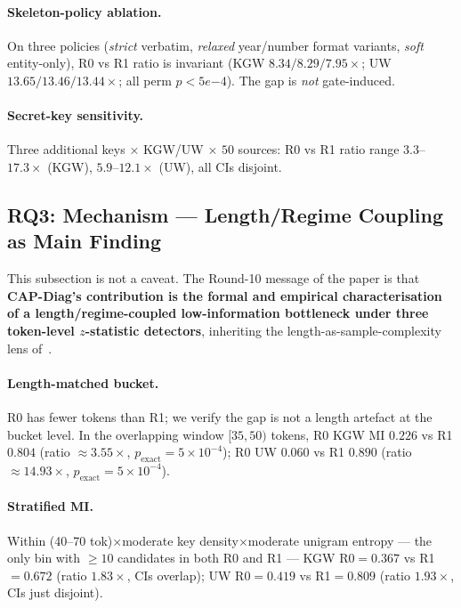 \documentclass[11pt]{article}
\begin{document}
\paragraph{Skeleton-policy ablation.} On three policies
(\emph{strict} verbatim, \emph{relaxed} year/number format variants,
\emph{soft} entity-only), R0 vs R1 ratio is invariant (KGW
$8.34/8.29/7.95\times$; UW $13.65/13.46/13.44\times$; all perm $p<5e{-4}$).
The gap is \emph{not} gate-induced.

\paragraph{Secret-key sensitivity.} Three additional keys × KGW/UW × $50$
sources: R0 vs R1 ratio range $3.3$--$17.3\times$ (KGW),
$5.9$--$12.1\times$ (UW), all CIs disjoint.

\subsection{RQ3: Mechanism --- Length/Regime Coupling as Main Finding}
\label{sec:c3}\label{sec:confound}

This subsection is not a caveat. The Round-10 message of the paper is
that \textbf{CAP-Diag's contribution is the formal and empirical
characterisation of a length/regime-coupled low-information bottleneck
under three token-level $z$-statistic detectors}, inheriting the
length-as-sample-complexity lens of~\citet{kirchenbauer2024reliability}.

\paragraph{Length-matched bucket.} R0 has fewer tokens than R1; we
verify the gap is not a length artefact at the bucket level. In the
overlapping window $[35,50)$ tokens, R0 KGW MI $0.226$ vs R1 $0.804$
(ratio $\approx 3.55\times$, $p_{\mathrm{exact}}=5{\times}10^{-4}$); R0 UW
$0.060$ vs R1 $0.890$ (ratio $\approx 14.93\times$,
$p_{\mathrm{exact}}=5{\times}10^{-4}$).

\paragraph{Stratified MI.} Within (40--70 tok)$\times$moderate
key density$\times$moderate unigram entropy --- the only bin with
$\geq\!10$ candidates in both R0 and R1 --- KGW R0$=0.367$ vs R1$=0.672$
(ratio $1.83\times$, CIs overlap); UW R0$=0.419$ vs R1$=0.809$ (ratio
$1.93\times$, CIs just disjoint).
\end{document}
